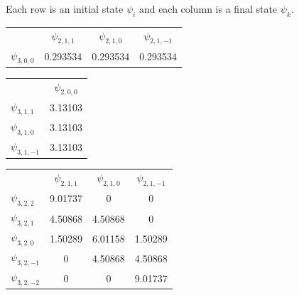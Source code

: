 \documentclass[12pt]{article}
\begin{document}
\bigskip
\noindent
Each row is an initial state $\psi_i$ and each column is a final state $\psi_k$.
%
\begin{center}
\begin{tabular}{lccc}
& $\psi_{2,1,1}$ & $\psi_{2,1,0}$ & $\psi_{2,1,-1}$
\\[1ex]
$\psi_{3,0,0}$ & 0.293534 & 0.293534 & 0.293534
\end{tabular}
\end{center}
%
\begin{center}
\begin{tabular}{lc}
& $\psi_{2,0,0}$
\\[1ex]
$\psi_{3,1,1}$ & 3.13103
\\
$\psi_{3,1,0}$ & 3.13103
\\
$\psi_{3,1,-1}$ & 3.13103
\end{tabular}
\end{center}
%
\begin{center}
\begin{tabular}{lccc}
& $\psi_{2,1,1}$ & $\psi_{2,1,0}$ & $\psi_{2,1,-1}$
\\[1ex]
$\psi_{3,2,2}$ & 9.01737 & 0 & 0
\\
$\psi_{3,2,1}$ & 4.50868 & 4.50868 & 0
\\
$\psi_{3,2,0}$ & 1.50289 & 6.01158 & 1.50289
\\
$\psi_{3,2,-1}$ & 0 & 4.50868 & 4.50868
\\
$\psi_{3,2,-2}$ & 0 & 0 & 9.01737
\end{tabular}
\end{center}
\end{document}
